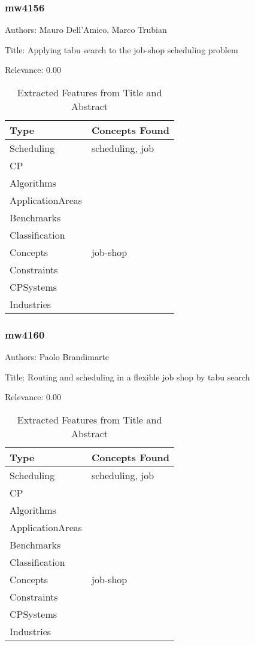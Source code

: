 \subsubsection{mw4156}
\label{mw:mw4156}

Authors: Mauro Dell'Amico, Marco Trubian

Title: Applying tabu search to the job-shop scheduling problem

Relevance:  0.00

{\scriptsize
\begin{longtable}{p{2cm}p{20cm}}
\caption{Extracted Features from Title and Abstract}\\ \toprule
Type & Concepts Found\\ \midrule
\endhead
\bottomrule
\endfoot
Scheduling & scheduling, job\\ 
CP & \\ 
Algorithms & \\ 
ApplicationAreas & \\ 
Benchmarks & \\ 
Classification & \\ 
Concepts & job-shop\\ 
Constraints & \\ 
CPSystems & \\ 
Industries & \\ 
\end{longtable}
}



\subsubsection{mw4160}
\label{mw:mw4160}

Authors: Paolo Brandimarte

Title: Routing and scheduling in a flexible job shop by tabu search

Relevance:  0.00

{\scriptsize
\begin{longtable}{p{2cm}p{20cm}}
\caption{Extracted Features from Title and Abstract}\\ \toprule
Type & Concepts Found\\ \midrule
\endhead
\bottomrule
\endfoot
Scheduling & scheduling, job\\ 
CP & \\ 
Algorithms & \\ 
ApplicationAreas & \\ 
Benchmarks & \\ 
Classification & \\ 
Concepts & job-shop\\ 
Constraints & \\ 
CPSystems & \\ 
Industries & \\ 
\end{longtable}
}



